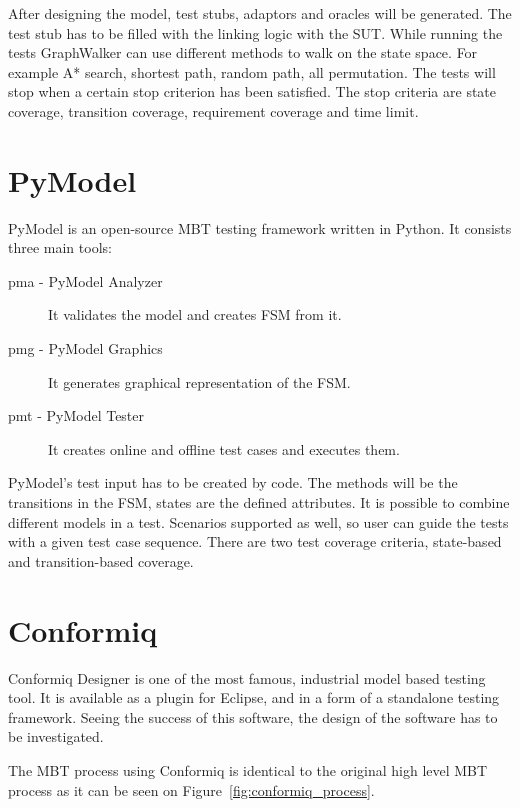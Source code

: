 After designing the model, test stubs, adaptors and oracles will be generated. The test stub has to be filled with the linking logic with the SUT. While running the tests GraphWalker can use different methods to walk on the state space. For example A* search, shortest path, random path, all permutation. The tests will stop when a certain stop criterion has been satisfied. The stop criteria are state coverage, transition coverage, requirement coverage and time limit.


\section{PyModel}
\label{sec:pymodel}

PyModel \cite{pymodelarticle}\cite{pymodel} is an open-source MBT testing framework written in Python. It consists three main tools:

\begin{description}
	\item[pma - PyModel Analyzer] It validates the model and creates FSM from it.
    \item[pmg - PyModel Graphics] It generates graphical representation of the FSM.
    \item[pmt - PyModel Tester] It creates online and offline test cases and executes them.
\end{description}

PyModel's test input has to be created by code. The methods will be the transitions in the FSM, states are the defined attributes. It is possible to combine different models in a test. Scenarios supported as well, so user can guide the tests with a given test case sequence. There are two test coverage criteria, state-based and transition-based coverage.


\section{Conformiq}
\label{sec:conformiq}

Conformiq Designer is one of the most famous, industrial model based testing tool. It is available as a plugin for Eclipse, and in a form of a standalone testing framework. Seeing the success of this software, the design of the software has to be investigated.

The MBT process using Conformiq is identical to the original high level MBT process as it can be seen on Figure~\ref{fig:conformiq_process}.

